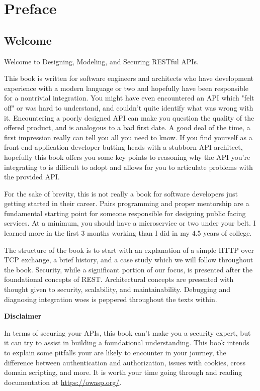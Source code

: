 \chapter*{Preface}

\section*{Welcome}

Welcome to Designing, Modeling, and Securing RESTful APIs.

This book is written for software engineers and architects who have development experience with a modern language or two and hopefully have been responsible for a nontrivial integration.  You might have even encountered an API which "felt off" or was hard to understand, and couldn't quite identify what was wrong with it.  Encountering a poorly designed API can make you question the quality of the offered product, and is analogous to a bad first date.  A good deal of the time, a first impression really can tell you all you need to know.  If you find yourself as a front-end application developer butting heads with a stubborn API architect, hopefully this book offers you some key points to reasoning why the API you're integrating to is difficult to adopt and allows for you to articulate problems with the provided API.

For the sake of brevity, this is not really a book for software developers just getting started in their career.  Pairs programming and proper mentorship are a fundamental starting point for someone responsible for designing public facing services.  At a minimum, you should have a microservice or two under your belt.  I learned more in the first 3 months working than I did in my 4.5 years of college.

The structure of the book is to start with an explanation of a simple HTTP over TCP exchange, a brief history, and a case study which we will follow throughout the book.  Security, while a significant portion of our focus, is presented after the foundational concepts of REST.  Architectural concepts are presented with thought given to security, scalability, and maintainability. Debugging and diagnosing integration woes is peppered throughout the texts within.

\begin{sidebar}
\begin{center}
\textbf{Disclaimer}
\end{center}
In terms of securing your APIs, this book can't make you a security expert, but it can try to assist in building a foundational understanding.  This book intends to explain some pitfalls your are likely to encounter in your journey, the difference between authentication and authorization, issues with cookies, cross domain scripting, and more.  It is worth your time going through and reading documentation at \url{https://owasp.org/}.
\end{sidebar}


